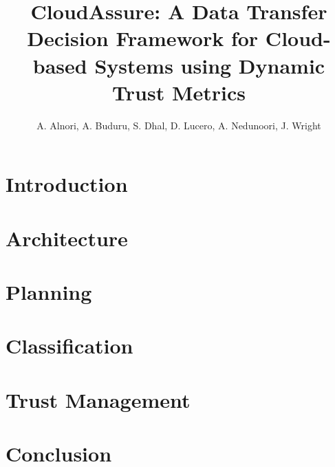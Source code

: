 \documentclass[12pt,a4paper]{report}
\title{CloudAssure: A Data Transfer Decision Framework for 
Cloud-based Systems using Dynamic Trust 
Metrics}
\author{A. Alnori, A. Buduru, S. Dhal, D. Lucero, A. Nedunoori, J. Wright}
\begin{document}
\maketitle
\tableofcontents

\chapter{Introduction}


\chapter{Architecture}


\chapter{Planning}


\chapter{Classification}


\chapter{Trust Management}


\chapter{Conclusion}


\clearpage
\printbibliography
\end{document}
